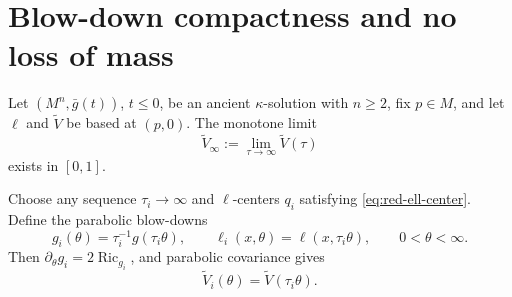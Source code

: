 \documentclass[10pt]{coll-l}
\theoremstyle{definition}
\theoremstyle{remark}
\numberwithin{section}{chapter}
\numberwithin{equation}{chapter}
\newcommand{\Ric}{\operatorname{Ric}}
\begin{document}
\section{Blow-down compactness and no loss of mass}
\label{sec:red-asymptotic}

Let $(M^n,\bar g(t))$, $t\leq0$, be an ancient $\kappa$-solution with
$n\geq2$, fix
$p\in M$, and let $\ell$ and $\widetilde V$ be based at $(p,0)$.  The
monotone limit
\begin{equation}
                   \widetilde V_\infty
       :=\lim_{\tau\to\infty}\widetilde V(\tau)          \label{eq:red-asymptotic-volume}
\end{equation}
exists in $[0,1]$.

Choose any sequence $\tau_i\to\infty$ and $\ell$-centers $q_i$ satisfying
\eqref{eq:red-ell-center}.  Define the parabolic blow-downs
\begin{equation}
 g_i(\theta)=\tau_i^{-1}g(\tau_i\theta),
 \qquad
 \ell_i(x,\theta)=\ell(x,\tau_i\theta),
 \qquad 0<\theta<\infty.                                \label{eq:red-blowdown-definition}
\end{equation}
Then $\partial_\theta g_i=2\Ric_{g_i}$, and parabolic covariance gives
\begin{equation}
 \widetilde V_i(\theta)=\widetilde V(\tau_i\theta).      \label{eq:red-blowdown-volume}
\end{equation}
\end{document}
